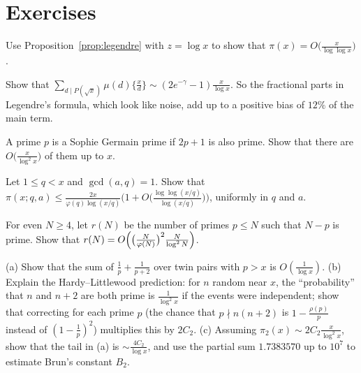 \section{Exercises}

\begin{exercise}[$\star$]\label{ex:legendrepi}
Use Proposition~\ref{prop:legendre} with $z=\log x$ to show that $\pi(x)=O\bigl(\frac x{\log\log x}\bigr)$.
\end{exercise}

\begin{exercise}[$\star$]\label{ex:legendrefail}
Show that $\sum_{d\mid P(\sqrt x)}\mu(d)\bigl\{\frac xd\bigr\}\sim(2e^{-\gamma}-1)\frac x{\log x}$. So the fractional parts in Legendre's formula, which look like noise, add up to a positive bias of $12\%$ of the main term.
\end{exercise}

\begin{exercise}[$\star$]\label{ex:sophie}
A prime $p$ is a Sophie Germain prime if $2p+1$ is also prime. Show that there are $O\bigl(\frac x{\log^2x}\bigr)$ of them up to $x$.
\end{exercise}

\begin{exercise}[$\star\star$]\label{ex:btap}
Let $1\le q<x$ and $\gcd(a,q)=1$. Show that $\pi(x;q,a)\le\frac{2x}{\varphi(q)\log(x/q)}\bigl(1+O\bigl(\frac{\log\log(x/q)}{\log(x/q)}\bigr)\bigr)$, uniformly in $q$ and $a$.
\end{exercise}

\begin{exercise}[$\star\star$]\label{ex:goldbachup}
For even $N\ge4$, let $r(N)$ be the number of primes $p\le N$ such that $N-p$ is prime. Show that $r(N)=O\Bigl(\bigl(\frac N{\varphi(N)}\bigr)^2\frac N{\log^2N}\Bigr)$.
\end{exercise}

\begin{exercise}\label{ex:twinheuristic}
(a) Show that the sum of $\frac1p+\frac1{p+2}$ over twin pairs with $p>x$ is $O(\frac1{\log x})$.
(b) Explain the Hardy--Littlewood prediction: for $n$ random near $x$, the ``probability'' that $n$ and $n+2$ are both prime is $\frac1{\log^2x}$ if the events were independent; show that correcting for each
prime $p$ (the chance that $p\nmid n(n+2)$ is $1-\frac{\rho(p)}p$ instead of $(1-\frac1p)^2$) multiplies this by $2C_2$.
(c) Assuming $\pi_2(x)\sim2C_2\frac x{\log^2x}$, show that the tail in (a) is $\sim\frac{4C_2}{\log x}$, and use the partial sum $1.7383570$ up to $10^7$ to estimate Brun's constant $B_2$.
\end{exercise}

